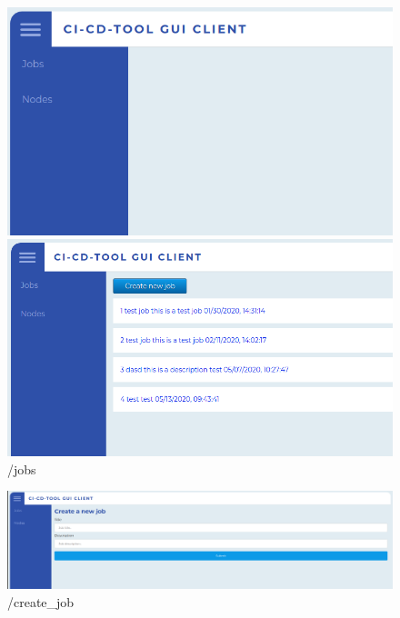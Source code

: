 \documentclass{article}
\begin{document}
\begin{figure}[H]
    \begin{minipage}{0.45\linewidth}
       \includegraphics[width=\linewidth]{index}
        \caption{/}
    \end{minipage}
    \begin{minipage}{0.45\linewidth}
       \includegraphics[width=\linewidth]{jobs}
        \caption{/jobs}
    \end{minipage}
\end{figure}

\begin{figure}[H]
    \centering
    \includegraphics[scale=0.2]{create_job}
    \caption{/create\_job}
\end{figure}
\end{document}
